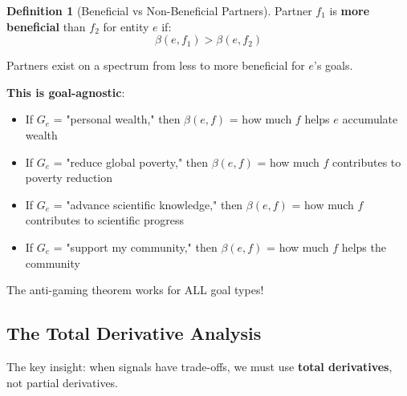 \documentclass[11pt,a4paper]{article}
\theoremstyle{definition}
\newtheorem{definition}[theorem]{Definition}
\theoremstyle{remark}
\begin{document}
\begin{definition}[Beneficial vs Non-Beneficial Partners]
Partner $f_1$ is \textbf{more beneficial} than $f_2$ for entity $e$ if:
\[ \beta(e,f_1) > \beta(e,f_2) \]

Partners exist on a spectrum from less to more beneficial for $e$'s goals.

\textbf{This is goal-agnostic}:
\begin{itemize}
\item If $G_e$ = "personal wealth," then $\beta(e,f)$ = how much $f$ helps $e$ accumulate wealth
\item If $G_e$ = "reduce global poverty," then $\beta(e,f)$ = how much $f$ contributes to poverty reduction
\item If $G_e$ = "advance scientific knowledge," then $\beta(e,f)$ = how much $f$ contributes to scientific progress
\item If $G_e$ = "support my community," then $\beta(e,f)$ = how much $f$ helps the community
\end{itemize}

The anti-gaming theorem works for ALL goal types!
\end{definition}

\subsection{The Total Derivative Analysis}

The key insight: when signals have trade-offs, we must use \textbf{total derivatives}, not partial derivatives.
\end{document}
